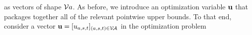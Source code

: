 \documentclass{article}
\begin{document}
as vectors of shape $\mathcal V a$.
As before, we introduce an optimization variable $\mathbf{u}$ that packages together
    all of the relevant pointwise upper bounds.
To that end, consider a 
vector
$\mathbf{u} = [u_{a,s,t}]_{(a,s,t) \in \mathcal V\!\mathcal A}$
in the optimization problem
%
%
\end{document}
